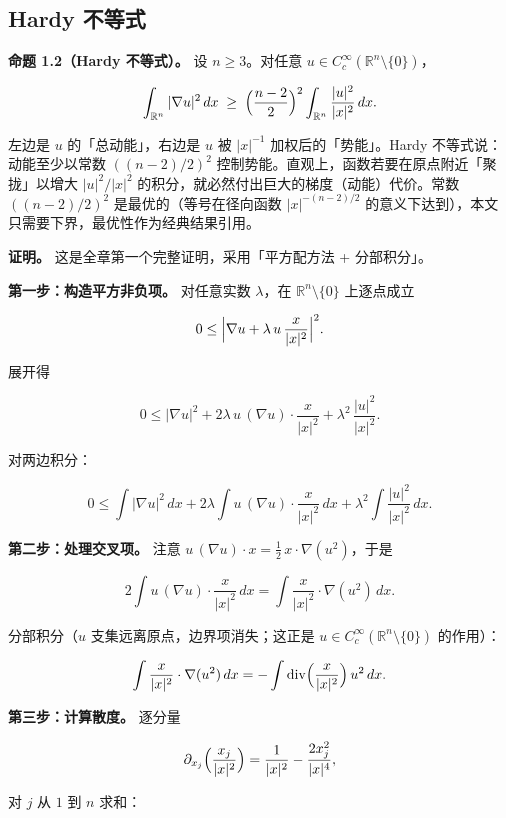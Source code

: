 \documentclass[a4paper,11pt,openany]{ctexbook}
\numberwithin{equation}{chapter}
\numberwithin{figure}{chapter}
\numberwithin{table}{chapter}
\begin{document}
\subsection{Hardy 不等式}

\textbf{命题 1.2（Hardy 不等式）。} 设 $n\ge 3$。对任意 $u\in C_c^\infty(\mathbb R^n\setminus\{0\})$，

$$\int_{\mathbb R^n}|\nabla u|^2\,dx \;\ge\; \Bigl(\frac{n-2}{2}\Bigr)^2 \int_{\mathbb R^n}\frac{|u|^2}{|x|^2}\,dx .$$

\begin{intuitionbox}
左边是 $u$ 的「总动能」，右边是 $u$ 被 $|x|^{-1}$ 加权后的「势能」。Hardy 不等式说：动能至少以常数 $((n-2)/2)^2$ 控制势能。直观上，函数若要在原点附近「聚拢」以增大 $|u|^2/|x|^2$ 的积分，就必然付出巨大的梯度（动能）代价。常数 $((n-2)/2)^2$ 是最优的（等号在径向函数 $|x|^{-(n-2)/2}$ 的意义下达到），本文只需要下界，最优性作为经典结果引用。
\end{intuitionbox}

\textbf{证明。} 这是全章第一个完整证明，采用「平方配方法 + 分部积分」。

\textbf{第一步：构造平方非负项。} 对任意实数 $\lambda$，在 $\mathbb R^n\setminus\{0\}$ 上逐点成立

$$0\le \Bigl|\nabla u + \lambda\, u\,\frac{x}{|x|^2}\Bigr|^2 .$$

展开得

$$0\le |\nabla u|^2 + 2\lambda\, u\,(\nabla u)\cdot\frac{x}{|x|^2} + \lambda^2\,\frac{|u|^2}{|x|^2}.$$

对两边积分：

$$0\le \int|\nabla u|^2\,dx + 2\lambda\int u\,(\nabla u)\cdot\frac{x}{|x|^2}\,dx + \lambda^2\int\frac{|u|^2}{|x|^2}\,dx .$$

\textbf{第二步：处理交叉项。} 注意 $u\,(\nabla u)\cdot x = \frac12\, x\cdot\nabla(u^2)$，于是

$$2\int u\,(\nabla u)\cdot\frac{x}{|x|^2}\,dx
=\int \frac{x}{|x|^2}\cdot\nabla(u^2)\,dx .$$

分部积分（$u$ 支集远离原点，边界项消失；这正是 $u\in C_c^\infty(\mathbb R^n\setminus\{0\})$ 的作用）：

$$\int \frac{x}{|x|^2}\cdot\nabla(u^2)\,dx
= -\int \mathrm{div}\Bigl(\frac{x}{|x|^2}\Bigr)\, u^2\,dx .$$

\textbf{第三步：计算散度。} 逐分量

$$\partial_{x_j}\Bigl(\frac{x_j}{|x|^2}\Bigr)
= \frac{1}{|x|^2} - \frac{2x_j^2}{|x|^4},$$

对 $j$ 从 $1$ 到 $n$ 求和：
\end{document}

